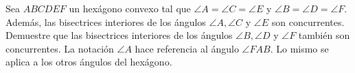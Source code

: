 Sea $ABCDEF$ un hexágono convexo tal que $\angle A = \angle C = \angle E$ y $\angle B = \angle D = \angle F$.
Además, las bisectrices interiores de los ángulos $\angle A, \angle C$ y $\angle E$ son concurrentes.
Demuestre que las bisectrices interiores de los ángulos $\angle B, \angle D$ y $\angle F$ también son concurrentes.
La notación $\angle A$ hace referencia al ángulo $\angle FAB$. Lo mismo se aplica a los otros ángulos del hexágono.